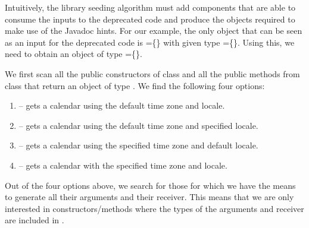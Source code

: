 \documentclass[runningheads,a4paper]{llncs}
\begin{document}
Intuitively, the library seeding algorithm must add components that are able to consume the
inputs to the deprecated code and produce the objects required to make use
of the Javadoc hints. For our example, the only object that can be seen as an input for the 
deprecated code is =\{\} with given type =\{\}. Using this, we need to obtain an object of type =\{\}.

We first scan all the public constructors of class 
and all the public methods from class  that return an object of type . We find the following four options:

\begin{enumerate}
  \item {} -- gets a calendar using the default time zone and locale.
  \item {} -- gets a calendar using the default time zone and specified locale.
  \item {} -- gets a calendar using the specified time zone and default locale.
  \item {} -- gets a calendar with the specified time zone and locale.
\end{enumerate}

%
Out of the four options above, we search for those for which we have the means to generate all their arguments and their receiver. This means that we are only interested in constructors/methods
where the types of the arguments and receiver are included in .
\end{document}
